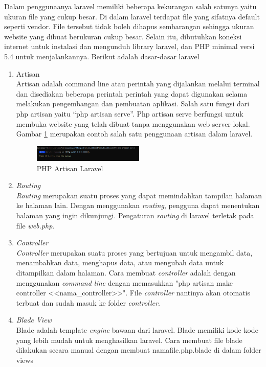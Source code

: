 Dalam penggunaanya laravel memiliki beberapa kekurangan salah satunya yaitu ukuran file yang cukup besar. Di dalam laravel terdapat file yang sifatnya default seperti vendor. File tersebut tidak boleh dihapus sembarangan sehingga ukuran website yang dibuat berukuran cukup besar. Selain itu, dibutuhkan koneksi internet untuk instalasi dan mengunduh library laravel, dan PHP minimal versi 5.4 untuk menjalankannya. Berikut adalah dasar-dasar laravel
\begin{enumerate}
	\item Artisan \\
	Artisan adalah command line atau perintah yang dijalankan melalui terminal dan disediakan beberapa perintah perintah yang dapat digunakan selama melakukan pengembangan dan pembuatan aplikasi. Salah satu fungsi dari php artisan yaitu “php artisan serve”. Php artisan serve berfungsi untuk membuka website yang telah dibuat tanpa menggunakan web server lokal. Gambar \ref{fig:artisan} merupakan contoh salah satu penggunaan artisan dalam laravel.
	
	\begin{figure}[H]
		\centering
		\includegraphics[width=0.5\textwidth]{Gambar/artisan.png}
		\caption{PHP Artisan Laravel}
		\label{fig:artisan}
	\end{figure}
	
	\item \textit{Routing} \\
	\textit{Routing} merupakan suatu proses yang dapat memindahkan tampilan halaman ke halaman lain. Dengan menggunakan \textit{routing}, pengguna dapat menentukan halaman yang ingin dikunjungi. Pengaturan \textit{routing} di laravel terletak pada file \textit{web.php}.
	
	\item \textit{Controller} \\
	\textit{Controller} merupakan suatu proses yang bertujuan untuk mengambil data, menambahkan data, menghapus data, atau mengubah data untuk ditampilkan dalam halaman. Cara membuat \textit{controller} adalah dengan menggunakan \textit{command line} dengan memasukkan "php artisan make controller <<nama\_controller>>". File \textit{controller} nantinya akan otomatis terbuat dan sudah masuk ke folder \textit{controller}.
	
	\item \textit{Blade View} \\
	Blade adalah template \textit{engine} bawaan dari laravel. Blade memiliki kode kode yang lebih mudah untuk menghasilkan laravel. Cara membuat file blade dilakukan secara manual dengan membuat nama\textunderscore file.php.blade di dalam folder views
\end{enumerate}

